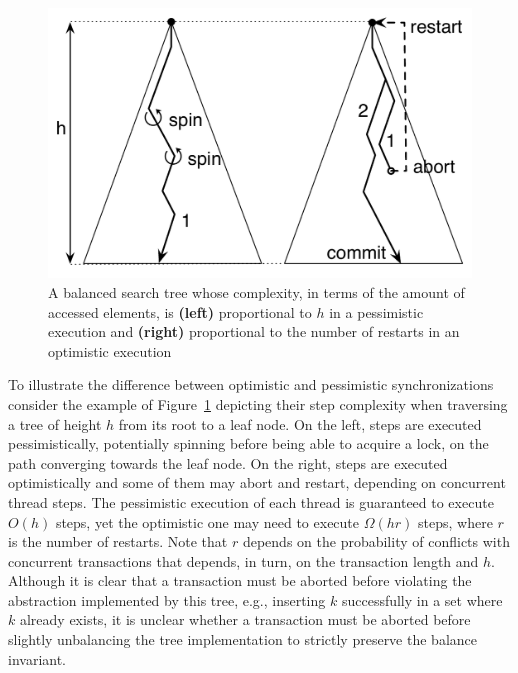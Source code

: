 \begin{figure}[t]
	\begin{center}
	\includegraphics[scale=0.4]{Tree/fig/complexity}
	\caption{A balanced search tree whose complexity, in terms of the amount of accessed elements, is {\bf (left)} proportional to $h$ 
	in a pessimistic execution and {\bf (right)} proportional to the number of restarts in an optimistic execution\label{fig:complexity}}
	\end{center}
\end{figure}

To illustrate the difference between optimistic and pessimistic 
synchronizations consider the example of 
Figure~\ref{fig:complexity} depicting their step complexity when
traversing a tree of height $h$ from its root to a leaf node. On the left, 
steps are executed pessimistically, potentially spinning before being able to acquire 
a lock, on the path converging towards the leaf node. On the right, 
steps are executed optimistically and some of them
may abort and restart, depending on concurrent thread steps. The pessimistic 
execution of each thread is guaranteed to execute $O(h)$ steps, yet the optimistic one 
may need to execute $\Omega(hr)$ steps, where $r$ is the number of restarts. 
Note that $r$ depends 
on the probability of conflicts with concurrent transactions that depends, in turn, 
on the transaction length and $h$.
Although it is clear that a transaction must be aborted before violating 
the abstraction implemented by this tree,
e.g., inserting $k$ successfully in a set where $k$ already exists,
it is unclear whether a transaction must be aborted before 
slightly unbalancing the tree implementation to strictly preserve the balance invariant.

